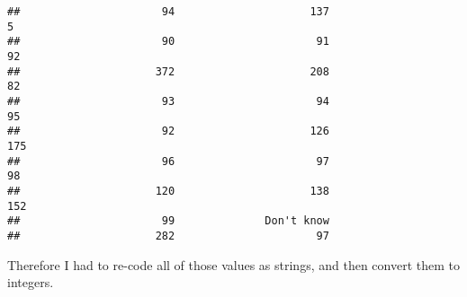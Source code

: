 \documentclass[
]{article}
\begin{document}
\begin{verbatim}
##                      94                     137                       5 
##                      90                      91                      92 
##                     372                     208                      82 
##                      93                      94                      95 
##                      92                     126                     175 
##                      96                      97                      98 
##                     120                     138                     152 
##                      99              Don't know 
##                     282                      97
\end{verbatim}

Therefore I had to re-code all of those values as strings, and then
convert them to integers.
\end{document}
